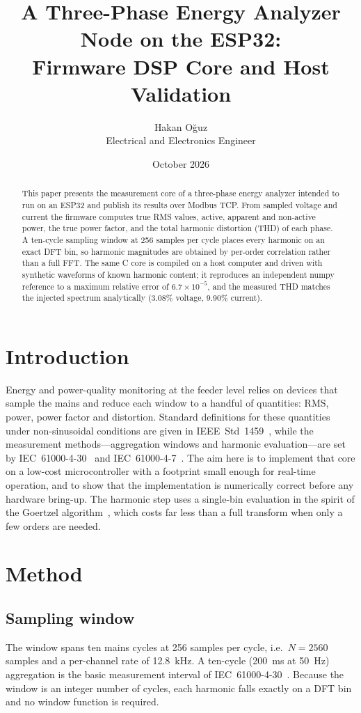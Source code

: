 \documentclass[11pt,a4paper]{article}
\title{A Three-Phase Energy Analyzer Node on the ESP32:\\
Firmware DSP Core and Host Validation}
\author{Hakan O\u{g}uz\\ \small Electrical and Electronics Engineer}
\date{October 2026}
\begin{document}
\maketitle

\begin{abstract}
This paper presents the measurement core of a three-phase energy analyzer intended to run on an
ESP32 and publish its results over Modbus TCP. From sampled voltage and current the firmware
computes true RMS values, active, apparent and non-active power, the true power factor, and the
total harmonic distortion (THD) of each phase. A ten-cycle sampling window at 256 samples per
cycle places every harmonic on an exact DFT bin, so harmonic magnitudes are obtained by
per-order correlation rather than a full FFT. The same C core is compiled on a host computer and
driven with synthetic waveforms of known harmonic content; it reproduces an independent numpy
reference to a maximum relative error of $6.7\times10^{-5}$, and the measured THD matches the
injected spectrum analytically (3.08\% voltage, 9.90\% current).
\end{abstract}

\section{Introduction}
Energy and power-quality monitoring at the feeder level relies on devices that sample the mains
and reduce each window to a handful of quantities: RMS, power, power factor and distortion.
Standard definitions for these quantities under non-sinusoidal conditions are given in
IEEE~Std~1459~\citep{ieee1459}, while the measurement methods---aggregation windows and harmonic
evaluation---are set by IEC~61000-4-30~\citep{iec4030} and IEC~61000-4-7~\citep{iec4007}. The aim
here is to implement that core on a low-cost microcontroller with a footprint small enough for
real-time operation, and to show that the implementation is numerically correct before any
hardware bring-up. The harmonic step uses a single-bin evaluation in the spirit of the Goertzel
algorithm~\citep{goertzel1958}, which costs far less than a full transform when only a few orders
are needed.

\section{Method}
\subsection{Sampling window}
The window spans ten mains cycles at 256 samples per cycle, i.e.\ $N=2560$ samples and a
per-channel rate of 12.8~kHz. A ten-cycle (200~ms at 50~Hz) aggregation is the basic measurement
interval of IEC~61000-4-30~\citep{iec4030}. Because the window is an integer number of cycles,
each harmonic falls exactly on a DFT bin and no window function is required.
\end{document}
